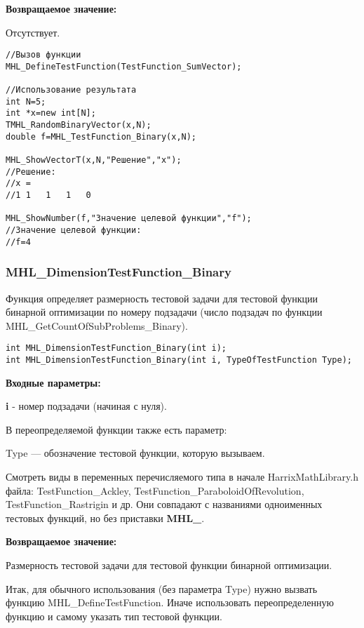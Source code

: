 \documentclass[a4paper,12pt]{article}
\begin{document}
\textbf{Возвращаемое значение:}
 
Отсутствует.


\begin{lstlisting}[label=code_use_MHL_DefineTestFunction,caption=Пример использования]
//Вызов функции
MHL_DefineTestFunction(TestFunction_SumVector);

//Использование результата
int N=5;
int *x=new int[N];
TMHL_RandomBinaryVector(x,N);
double f=MHL_TestFunction_Binary(x,N);

MHL_ShowVectorT(x,N,"Решение","x");
//Решение:
//x =	
//1	1	1	1	0

MHL_ShowNumber(f,"Значение целевой функции","f");
//Значение целевой функции:
//f=4
\end{lstlisting}

\subsubsection{MHL\_DimensionTestFunction\_Binary}\label{MHL_DimensionTestFunction_Binary}

Функция определяет размерность тестовой задачи для тестовой функции бинарной оптимизации по номеру подзадачи (число подзадач по функции MHL\_GetCountOfSubProblems\_Binary).


\begin{lstlisting}[label=code_syntax_MHL_DimensionTestFunction_Binary,caption=Синтаксис]
int MHL_DimensionTestFunction_Binary(int i);
int MHL_DimensionTestFunction_Binary(int i, TypeOfTestFunction Type);
\end{lstlisting}

\textbf{Входные параметры:}

\textbf{i} - номер подзадачи (начиная с нуля).

В переопределяемой функции также есть параметр:
  
Type --- обозначение тестовой функции, которую вызываем. 

Смотреть виды в переменных перечисляемого типа в начале HarrixMathLibrary.h файла: TestFunction\_Ackley, TestFunction\_ParaboloidOfRevolution, TestFunction\_Rastrigin и др. Они совпадают с названиями одноименных тестовых функций, но без приставки \textbf{MHL\_}.

\textbf{Возвращаемое значение:}
 
Размерность тестовой задачи для тестовой функции бинарной оптимизации.

Итак, для обычного использования (без параметра Type) нужно вызвать функцию MHL\_DefineTestFunction. Иначе использовать переопределенную функцию и самому указать тип тестовой функции.
\end{document}
